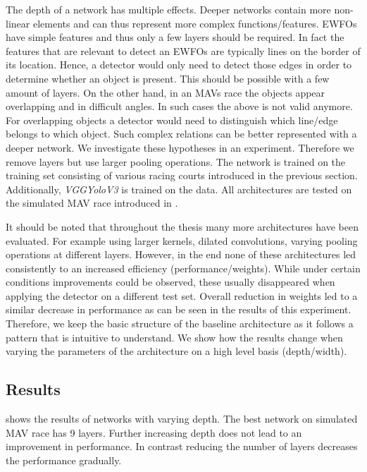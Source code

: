 The depth of a network has multiple effects. Deeper networks contain more non-linear elements and can thus represent more complex functions/features. \acp{EWFO} have simple features and thus only a few layers should be required. In fact the features that are relevant to detect an \acp{EWFO} are typically lines on the border of its location. Hence, a detector would only need to detect those edges in order to determine whether an object is present. This should be possible with a few amount of layers. On the other hand, in an \acp{MAV} race the objects appear overlapping and in difficult angles. In such cases the above is not valid anymore. For overlapping objects a detector would need to distinguish which line/edge belongs to which object. Such complex relations can be better represented with a deeper network. We investigate these hypotheses in an experiment. Therefore we remove layers but use larger pooling operations. The network is trained on the training set consisting of various racing courts introduced in the previous section. Additionally, \textit{VGGYoloV3} is trained on the data. All architectures are tested on the simulated \ac{MAV} race introduced in .

It should be noted that throughout the thesis many more architectures have been evaluated. For example using larger kernels, dilated convolutions, varying pooling operations at different layers. However, in the end none of these architectures led consistently to an increased efficiency (performance/weights). While under certain conditions improvements could be observed, these usually disappeared when applying the detector on a different test set. Overall reduction in weights led to a similar decrease in performance as can be seen in the results of this experiment. Therefore, we keep the basic structure of the baseline architecture as it follows a pattern that is intuitive to understand. We show how the results change when varying the parameters of the architecture on a high level basis (depth/width).

\subsection{Results}

 shows the results of networks with varying depth. The best network on simulated \ac{MAV} race has 9 layers. Further increasing depth does not lead to an improvement in performance. In contrast reducing the number of layers decreases the performance gradually. 

